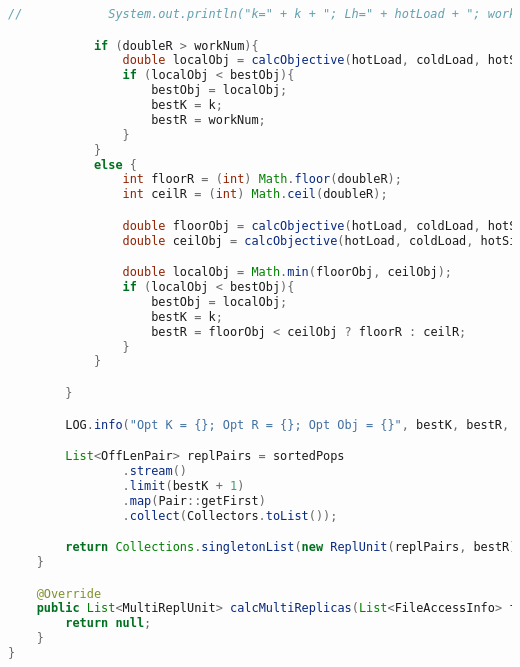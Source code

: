 \begin{Appendix}
\begin{lstlisting}[language=java]
//            System.out.println("k=" + k + "; Lh=" + hotLoad + "; workNum=" + workNum + "; Sh=" + hotSize + "; r=" + doubleR);

            if (doubleR > workNum){
                double localObj = calcObjective(hotLoad, coldLoad, hotSize, workNum);
                if (localObj < bestObj){
                    bestObj = localObj;
                    bestK = k;
                    bestR = workNum;
                }
            }
            else {
                int floorR = (int) Math.floor(doubleR);
                int ceilR = (int) Math.ceil(doubleR);

                double floorObj = calcObjective(hotLoad, coldLoad, hotSize, floorR);
                double ceilObj = calcObjective(hotLoad, coldLoad, hotSize, ceilR);

                double localObj = Math.min(floorObj, ceilObj);
                if (localObj < bestObj){
                    bestObj = localObj;
                    bestK = k;
                    bestR = floorObj < ceilObj ? floorR : ceilR;
                }
            }

        }

        LOG.info("Opt K = {}; Opt R = {}; Opt Obj = {}", bestK, bestR, bestObj);

        List<OffLenPair> replPairs = sortedPops
                .stream()
                .limit(bestK + 1)
                .map(Pair::getFirst)
                .collect(Collectors.toList());

        return Collections.singletonList(new ReplUnit(replPairs, bestR));
    }

    @Override
    public List<MultiReplUnit> calcMultiReplicas(List<FileAccessInfo> fileAccessInfos) {
        return null;
    }
}
    

\end{lstlisting}







\end{Appendix}